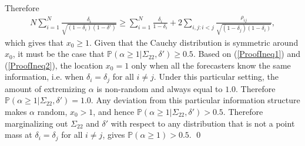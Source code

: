 \documentclass[11pt]{article}
\renewcommand{\P}{\mathbb{P}}
\theoremstyle{definition}
\theoremstyle{definition}
\def\P{{\mathbb P}}
\begin{document}
Therefore 
\begin{align*}
N \sum_{i=1}^N \frac{\delta_i}{\sqrt{(1-\delta_i)(1-\delta')}} \geq \sum_{i=1}^N \frac{\delta_i}{1-\delta_i} + 2 \sum_{i,j: i<j} \frac{\rho_{ij}}{\sqrt{(1-\delta_j)(1-\delta_i)}},
\end{align*}
which gives that $x_0 \geq 1$. Given that the Cauchy distribution is symmetric around $x_0$, it must be the case that $\P(\alpha \geq 1 | \Sigma_{22}, \delta') \geq 0.5$. Based on (\ref{ProofIneq1}) and (\ref{ProofIneq2}), the location $x_0 = 1$ only when all the forecasters know the same information, i.e. when $\delta_i = \delta_j$ for all $i \neq j$. Under this particular setting, the amount of extremizing $\alpha$ is non-random and always equal to $1.0$. Therefore $\P(\alpha \geq 1 | \Sigma_{22}, \delta') = 1.0$.  Any deviation from this particular information structure makes $\alpha$ random, $x_0 > 1$, and hence $\P(\alpha \geq 1 | \Sigma_{22}, \delta') > 0.5$. Therefore marginalizing out $\Sigma_{22}$ and $\delta'$ with respect to any distribution that is not a point mass at $\delta_i = \delta_j$ for all $i \neq j$, gives $\P(\alpha \geq 1) > 0.5$. \qed
\end{document}
